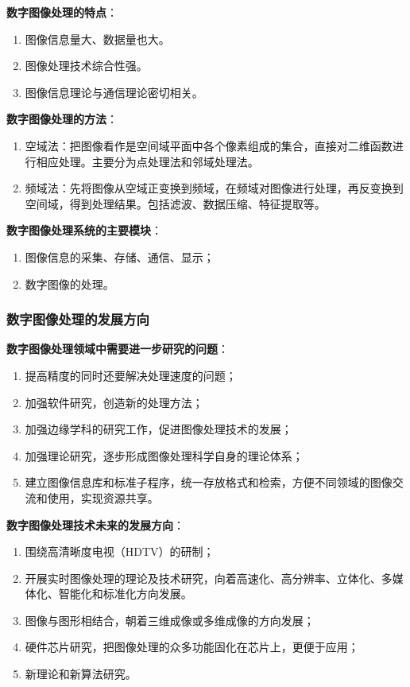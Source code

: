 \documentclass[cn, blue, normal, 12pt]{elegantnote}
\begin{document}
\textbf{数字图像处理的特点}：

\begin{enumerate}
    \item 图像信息量大、数据量也大。
    \item 图像处理技术综合性强。
    \item 图像信息理论与通信理论密切相关。
\end{enumerate}

\textbf{数字图像处理的方法}：

\begin{enumerate}
    \item 空域法：把图像看作是空间域平面中各个像素组成的集合，直接对二维函数进行相应处理。主要分为点处理法和邻域处理法。
    \item 频域法：先将图像从空域正变换到频域，在频域对图像进行处理，再反变换到空间域，得到处理结果。包括滤波、数据压缩、特征提取等。
\end{enumerate}

\textbf{数字图像处理系统的主要模块}：

\begin{enumerate}
    \item 图像信息的采集、存储、通信、显示；
    \item 数字图像的处理。
\end{enumerate}

\subsubsection{数字图像处理的发展方向}

\textbf{数字图像处理领域中需要进一步研究的问题}：

\begin{enumerate}
    \item 提高精度的同时还要解决处理速度的问题；
    \item 加强软件研究，创造新的处理方法；
    \item 加强边缘学科的研究工作，促进图像处理技术的发展；
    \item 加强理论研究，逐步形成图像处理科学自身的理论体系；
    \item 建立图像信息库和标准子程序，统一存放格式和检索，方便不同领域的图像交流和使用，实现资源共享。
\end{enumerate}

\textbf{数字图像处理技术未来的发展方向}：

\begin{enumerate}
    \item 围绕高清晰度电视（HDTV）的研制；
    \item 开展实时图像处理的理论及技术研究，向着高速化、高分辨率、立体化、多媒体化、智能化和标准化方向发展。
    \item 图像与图形相结合，朝着三维成像或多维成像的方向发展；
    \item 硬件芯片研究，把图像处理的众多功能固化在芯片上，更便于应用；
    \item 新理论和新算法研究。
\end{enumerate}
\end{document}

